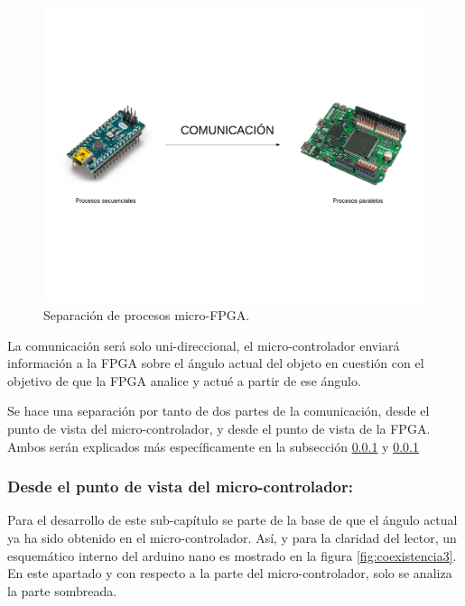\begin{figure}[H]
	\center
	\includegraphics[trim = 0mm 40mm 0mm 20mm, clip,scale=0.4]{imagenes/Balancing_robot/coexistencia1.pdf}
	\caption{Separación de procesos micro-FPGA.}
	\label{fig:coexistencia1}
\end{figure}

La comunicación será solo uni-direccional, el micro-controlador enviará información a la FPGA sobre el ángulo actual del objeto en cuestión con el objetivo de que la FPGA analice y actué a partir de ese ángulo.\newline

Se hace una separación por tanto de dos partes de la comunicación, desde el punto de vista del micro-controlador, y desde el punto de vista de la FPGA. Ambos serán explicados más específicamente en la subsección \ref{sec:vista_controlador} y \ref{sec:vista_controlador}

\subsubsection{Desde el punto de vista del micro-controlador:}  \label{sec:vista_controlador}

Para el desarrollo de este sub-capítulo se parte de la base de que el ángulo actual ya ha sido obtenido en el micro-controlador. Así, y para la claridad del lector, un esquemático interno del arduino nano es mostrado en la figura \ref{fig:coexistencia3}. En este apartado y con respecto a la parte del micro-controlador, solo se analiza la parte sombreada.  

